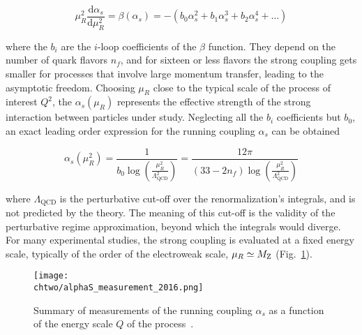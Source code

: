 \begin{equation}\label{eqn:SM_e48}
\mu^2_R\frac{\mathrm{d}\alpha_s}{\mathrm{d}\mu^2_R} = \beta(\alpha_s) = - (b_0\alpha^2_s + b_1\alpha^3_s + b_2\alpha^4_s + \dotsc)
\end{equation}

\noindent where the $b_i$ are the $i$-loop coefficients of the $\beta$ function.
They depend on the number of quark flavors $n_f$, and for sixteen or less flavors the strong coupling gets smaller for processes that involve large momentum transfer, leading to the asymptotic freedom.
Choosing $\mu_R$ close to the typical scale of the process of interest $Q^2$, the $\alpha_s(\mu_R)$ represents the effective strength of the strong interaction between particles under study.
Neglecting all the $b_i$ coefficients but $b_0$, an exact leading order expression for the running coupling $\alpha_s$ can be obtained

\begin{equation}\label{eqn:SM_e49}
\alpha_s(\mu^2_R) = \frac{1}{b_0\log \left( \frac{\mu^2_R}{\Lambda^2_\mathrm{QCD}} \right) } = \frac{12\pi}{(33-2n_f)\log \left( \frac{\mu^2_R}{\Lambda^2_\mathrm{QCD}} \right) }
\end{equation}

\noindent where $\Lambda_\mathrm{QCD}$ is the perturbative cut-off over the renormalization's integrals, and is not predicted by the theory.
The meaning of this cut-off is the validity of the perturbative regime approximation, beyond which the integrals would diverge.
For many experimental studies, the strong coupling is evaluated at a fixed energy scale, typically of the order of the electroweak scale, $\mu_R \simeq M_\mathrm{Z}$ (Fig.~\ref{fig:AlphaS}).

\begin{figure}[!htb]
  \centering
  \texttt{[image: \\chtwo/alphaS\_measurement\_2016.png]}
  \caption{Summary of measurements of the running coupling $\alpha_s$ as a function of the energy scale $Q$ of the process~\cite{Olive:2016xmw}.}
  \label{fig:AlphaS}
\end{figure} 